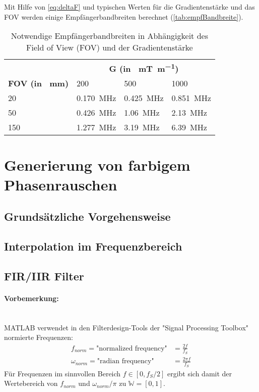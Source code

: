 Mit Hilfe von \autoref{eq:deltaF} und typischen Werten für die Gradientenstärke und das FOV werden einige Empfängerbandbreiten berechnet (\autoref{tab:empfBandbreite}).

\begin{table}[H]
	\centering
	\caption{Notwendige Empfängerbandbreiten in Abhängigkeit des Field of View (FOV) und der Gradientenstärke}
	\label{tab:empfBandbreite}
	\begin{tabular}{llll}
		\toprule
		& \multicolumn{3}{c}{\textbf{G (in \SI{}{\milli\tesla\per\meter})}} \\ \cmidrule{2-4}
		\textbf{FOV (in \SI{}{\mm})}& 200 & 500 & 1000 \\
		20 & \SI{0.170}{\mega\hertz} & \SI{0.425}{\mega\hertz} & \SI{0.851}{\mega\hertz} \\
		50 & \SI{0.426}{\mega\hertz} & \SI{1.06}{\mega\hertz} & \SI{2.13}{\mega\hertz} \\
		150 & \SI{1.277}{\mega\hertz} & \SI{3.19}{\mega\hertz} & \SI{6.39}{\mega\hertz} \\
		\bottomrule
	\end{tabular}
\end{table}

\section{Generierung von farbigem Phasenrauschen}

\subsection{Grundsätzliche Vorgehensweise}

\subsection{Interpolation im Frequenzbereich}

\subsection{FIR/IIR Filter}

\paragraph{Vorbemerkung:}\mbox{}\\
MATLAB verwendet in den Filterdesign-Tools der "Signal Processing Toolbox" normierte Frequenzen:
\begin{subequations}
	\begin{align}
	f_{norm} = \text{"normalized frequency"} &= \frac{2f}{f_S} \\
	\omega_{norm} = \text{"radian frequency"} &= \frac{2\pi f}{f_S}
	\end{align}
\end{subequations}
Für Frequenzen im sinnvollen Bereich $f\in [0,f_S/2]$ ergibt sich damit der Wertebereich von
$f_{norm}$ und $\omega_{norm}/\pi$ zu $\mathbb{W}=[0,1]$.

